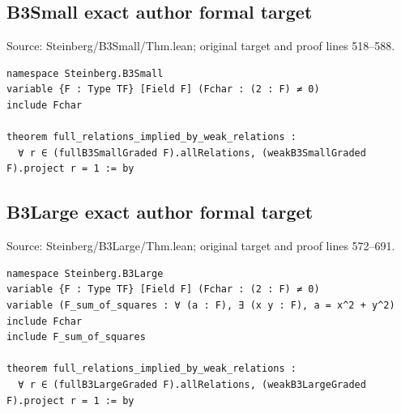 \documentclass[10pt,a4paper]{article}
\begin{document}
\subsection*{B3Small exact author formal target}
\noindent Source: Steinberg/B3Small/Thm.lean; original target and proof lines 518--588.
\begin{Verbatim}
namespace Steinberg.B3Small
variable {F : Type TF} [Field F] (Fchar : (2 : F) ≠ 0)
include Fchar

theorem full_relations_implied_by_weak_relations :
  ∀ r ∈ (fullB3SmallGraded F).allRelations, (weakB3SmallGraded F).project r = 1 := by
\end{Verbatim}

\subsection*{B3Large exact author formal target}
\noindent Source: Steinberg/B3Large/Thm.lean; original target and proof lines 572--691.
\begin{Verbatim}
namespace Steinberg.B3Large
variable {F : Type TF} [Field F] (Fchar : (2 : F) ≠ 0)
variable (F_sum_of_squares : ∀ (a : F), ∃ (x y : F), a = x^2 + y^2)
include Fchar
include F_sum_of_squares

theorem full_relations_implied_by_weak_relations :
  ∀ r ∈ (fullB3LargeGraded F).allRelations, (weakB3LargeGraded F).project r = 1 := by
\end{Verbatim}

\clearpage
\end{document}
